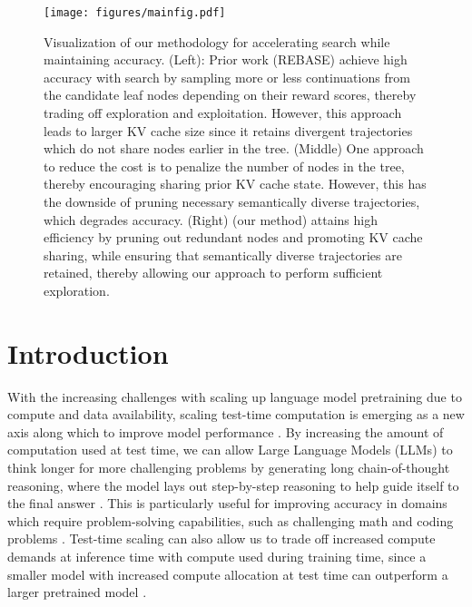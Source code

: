 
\begin{figure*}[h]%
\centering
\texttt{[image: figures/mainfig.pdf]}
\vspace*{-2mm}
 \caption{ 
  Visualization of our methodology for accelerating search while maintaining accuracy.
  (Left): Prior work (REBASE) achieve high accuracy with search by sampling more or less continuations from the candidate leaf nodes depending on their reward scores, thereby trading off exploration and exploitation. 
  However, this approach leads to larger KV cache size since it retains divergent trajectories which do not share nodes earlier in the tree.
  (Middle) One approach to reduce the cost is to penalize the number of nodes in the tree, thereby encouraging sharing prior KV cache state.
  However, this has the downside of pruning necessary semantically diverse trajectories, which degrades accuracy.
  (Right) \ours (our method) attains high efficiency by pruning out redundant nodes and promoting KV cache sharing, while ensuring that semantically diverse trajectories are retained, thereby allowing our approach to perform sufficient exploration.
  }
  \label{fig:main}
\end{figure*}
\section{Introduction}

With the increasing challenges with scaling up language model pretraining due to compute and data availability, scaling test-time computation is emerging as a new axis along which to improve model performance \cite{snell2024scaling}. 
By increasing the amount of computation used at test time, we can allow Large Language Models (LLMs) to think longer for more challenging problems by generating long chain-of-thought reasoning, where the model lays out step-by-step reasoning to help guide itself to the final answer \cite{wei2022chain}.
This is particularly useful for improving accuracy in domains which require problem-solving capabilities, such as challenging math and coding problems \cite{snell2024scaling,brown2024large}.
Test-time scaling can also allow us to trade off increased compute demands at inference time with compute used during training time, since a smaller model with increased compute allocation at test time can outperform a larger pretrained model \cite{beeching2024scalingtesttimecompute}. 

